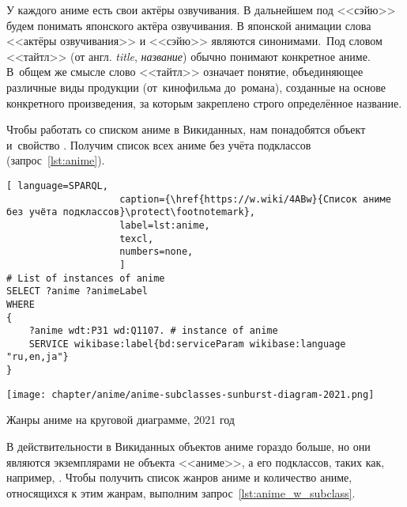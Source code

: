 У каждого аниме есть свои актёры озвучивания. 
В дальнейшем под <<сэйю>> будем понимать японского актёра озвучивания. 
В японской анимации слова <<актёры озвучивания>> и <<сэйю>> являются синонимами.\, %
%
Под словом <<тайтл>> (от англ. \emph{title}, \emph{название}) обычно понимают конкретное аниме\autocite{anime_social}. 
В~общем же смысле слово <<тайтл>> означает понятие, объединяющее различные виды продукции 
(от~кино\-фильма до~романа), созданные на основе конкретного произведения, за которым закреплено строго определённое название\autocite{anime_title_def}.

Чтобы работать со списком аниме в Викиданных, 
нам понадобятся объект  и~свойство . 
Получим список всех аниме без учёта подклассов (запрос~\ref{lst:anime}).

\newpage

\begin{lstlisting}[ language=SPARQL, 
                    caption={\href{https://w.wiki/4ABw}{Список аниме без учёта подклассов}\protect\footnotemark},
                    label=lst:anime,
                    texcl,
                    numbers=none,
                    ]
# List of instances of anime
SELECT ?anime ?animeLabel
WHERE
{
    ?anime wdt:P31 wd:Q1107. # instance of anime
    SERVICE wikibase:label{bd:serviceParam wikibase:language "ru,en,ja"}
}
\end{lstlisting}%

\begin{marginfigure}[1\baselineskip]
{\texttt{[image: chapter/anime/anime-subclasses-sunburst-diagram-2021.png]}}
\vspace{-7pt}
\caption{Жанры аниме на круговой диаграмме, 2021 год}%
\label{fig:anime_piechart}
\end{marginfigure}

В действительности в Викиданных объектов аниме гораздо больше, 
но они являются экземплярами не объекта <<аниме>>, а его подклассов, 
таких как, например, . 
Чтобы получить список жанров аниме и количество аниме, 
относящихся к этим жанрам, выполним запрос~\ref{lst:anime_w_subclass}.

